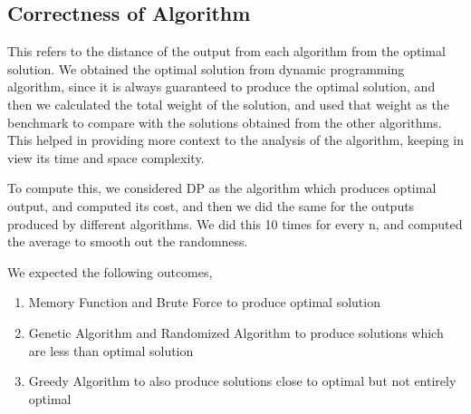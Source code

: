 \documentclass[a4paper, 11pt]{article}
\begin{document}
\subsection{Correctness of Algorithm}
This refers to the distance of the output from each algorithm from the optimal solution. We obtained the optimal solution from dynamic programming algorithm, since it is always guaranteed to produce the optimal solution, and then we calculated the total weight of the solution, and used that weight as the benchmark to compare with the solutions obtained from the other algorithms. This helped in providing more context to the analysis of the algorithm, keeping in view its time and space complexity.

To compute this, we considered DP as the algorithm which produces optimal output, and computed its cost, and then we did the same for the outputs produced by different algorithms. We did this 10 times for every n, and computed the average to smooth out the randomness. 

We expected the following outcomes, 
\begin{enumerate}
    \item Memory Function and Brute Force to produce optimal solution
    \item Genetic Algorithm and Randomized Algorithm to produce solutions which are less than optimal solution
    \item Greedy Algorithm to also produce solutions close to optimal but not entirely optimal
\end{enumerate}
\end{document}
